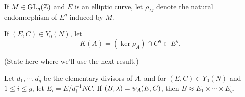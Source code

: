 \documentclass{amsart}
\begin{document}
\begin{definition}
If $M \in \operatorname{GL}_g(\mathbb{Z})$ and $E$ is an elliptic curve, let $\rho_M$ denote the natural endomorphism of $E^g$ induced by $M$.
\end{definition}



If $(E, C) \in Y_0(N)$, let
$$
K(A) = (\ker \rho_A) \cap C^g  \subset E^g.
$$

%



(State here where we'll use the next result.)
\begin{lemma}\label{lem:psimod-weakly-isomorphic-to-product}
  Let $d_1, \cdots, d_g$ be the elementary divisors of $A$, and for $(E,C) \in Y_0(N)$ and $1 \le i \le g$, let $E_i = E/d_i^{-1}NC$. If $(B,\lambda) = \psi_{A}(E,C)$, then
$
    B \approx E_1 \times \cdots \times E_g.
$
\end{lemma}
\end{document}
